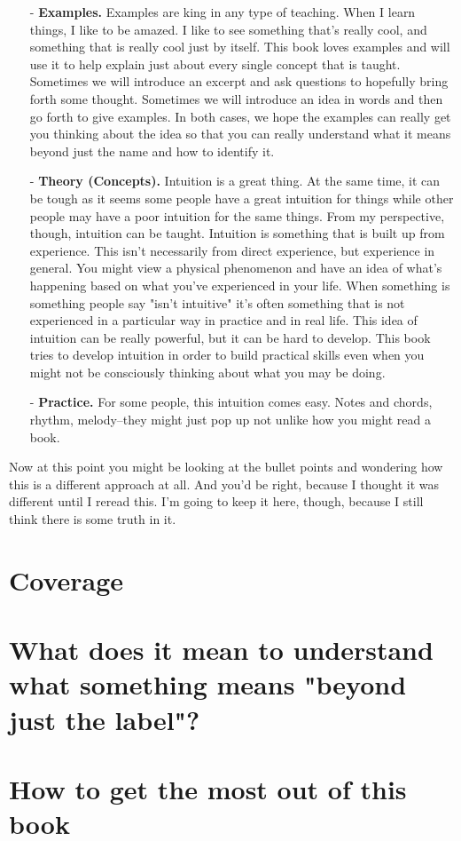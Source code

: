 \documentclass[../OpenAppliedMusicTheory.tex]{subfiles}
\begin{document}
    \begin{itemize}
        \item[-] \textbf{Examples.} Examples are king in any type of teaching. When I learn things, I like to be amazed. I like to see something that's really cool, and something that is really cool just by itself. This book loves examples and will use it to help explain just about every single concept that is taught. Sometimes we will introduce an excerpt and ask questions to hopefully bring forth some thought. Sometimes we will introduce an idea in words and then go forth to give examples. In both cases, we hope the examples can really get you thinking about the idea so that you can really understand what it means beyond just the name and how to identify it.
        \item[-] \textbf{Theory (Concepts).} Intuition is a great thing. At the same time, it can be tough as it seems some people have a great intuition for things while other people may have a poor intuition for the same things. From my perspective, though, intuition can be taught. Intuition is something that is built up from experience. This isn't necessarily from direct experience, but experience in general. You might view a physical phenomenon and have an idea of what's happening based on what you've experienced in your life. When something is something people say "isn't intuitive" it's often something that is not experienced in a particular way in practice and in real life. This idea of intuition can be really powerful, but it can be hard to develop. This book tries to develop intuition in order to build practical skills even when you might not be consciously thinking about what you may be doing.
        \item[-] \textbf{Practice.} For some people, this intuition comes easy. Notes and chords, rhythm, melody--they might just pop up not unlike how you might read a book.
    \end{itemize}

    Now at this point you might be looking at the bullet points and wondering how this is a different approach at all. And you'd be right, because I thought it was different until I reread this. I'm going to keep it here, though, because I still think there is some truth in it. %

    \section*{Coverage}

    \section*{What does it mean to understand what something means "beyond just the label"?}

    \section*{How to get the most out of this book}
\end{document}

